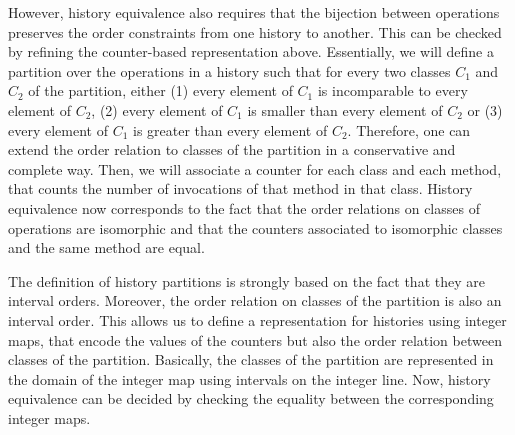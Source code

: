 However, history equivalence also requires that the bijection between
operations preserves the order constraints from one history to another. This
can be checked by refining the counter-based representation above. Essentially,
we will define a partition over the operations in a history such that for every
two classes $C_1$ and $C_2$ of the partition, either (1) every element of $C_1$
is incomparable to every element of $C_2$, (2) every element of $C_1$ is
smaller than every element of $C_2$ or (3) every element of $C_1$ is greater
than every element of $C_2$. Therefore, one can extend the order relation to
classes of the partition in a conservative and complete way. Then, we will
associate a counter for each class and each method, that counts the number of
invocations of that method in that class. History equivalence now corresponds
to the fact that the order relations on classes of operations are isomorphic
and that the counters associated to isomorphic classes and the same method are
equal.

The definition of history partitions is strongly based on the fact that they
are interval orders. Moreover, the order relation on classes of the partition
is also an interval order. This allows us to define a representation for
histories using integer maps, that encode the values of the counters but also
the order relation between classes of the partition. Basically, the classes of
the partition are represented in the domain of the integer map using intervals
on the integer line. Now, history equivalence can be decided by checking the
equality between the corresponding integer maps.

